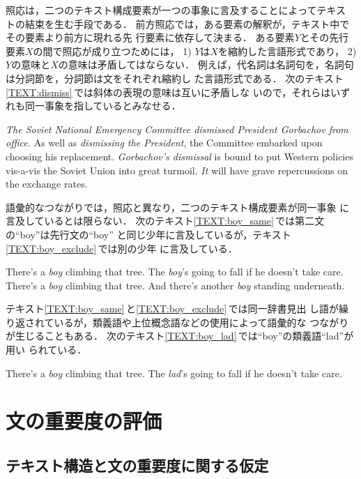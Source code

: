 照応は，二つのテキスト構成要素が一つの事象に言及することによってテキス
トの結束を生む手段である．
前方照応では，ある要素の解釈が，テキスト中でその要素より前方に現れる先
行要素に依存して決まる．
ある要素$Y$とその先行要素$X$の間で照応が成り立つためには，
1) $Y$は$X$を縮約した言語形式であり，
2) $Y$の意味と$X$の意味は矛盾してはならない\cite{Jelinek95}．
例えば，代名詞は名詞句を，名詞句は分詞節を，分詞節は文をそれぞれ縮約し
た言語形式である．
次のテキスト\ref{TEXT:dismiss}\,では斜体の表現の意味は互いに矛盾しな
いので，それらはいずれも同一事象を指しているとみなせる．
\begin{TEXT}
\text
{\it The Soviet National Emergency Committee dismissed President
Gorbachov from office.} 
As well as {\it dismissing the President}, the Committee
embarked upon choosing his replacement. 
{\it Gorbachov's dismissal} is bound to put Western policies
vis-a-vis the Soviet Union into great turmoil.
{\it It} will have grave repercussions on the exchange
rates.\label{TEXT:dismiss}
\end{TEXT}

語彙的なつながりでは，照応と異なり，二つのテキスト構成要素が同一事象
に言及しているとは限らない\cite{Halliday76}．
次のテキスト\ref{TEXT:boy_same}\,では第二文の``boy''は先行文の``boy''
と同じ少年に言及しているが，テキスト\ref{TEXT:boy_exclude}\,では別の少年
に言及している．
\begin{TEXT}
\text There's a {\it boy} climbing that tree.
The {\it boy}'s going to fall if he doesn't take care.
\label{TEXT:boy_same} 
\text There's a {\it boy} climbing that tree.
And there's another {\it boy} standing underneath.
\label{TEXT:boy_exclude}
\end{TEXT}
テキスト\ref{TEXT:boy_same}\,と\ref{TEXT:boy_exclude}\,では同一辞書見出
し語が繰り返されているが，類義語や上位概念語などの使用によって語彙的な
つながりが生じることもある．
次のテキスト\ref{TEXT:boy_lad}\,では``boy''の類義語``lad''が用い
られている．
\begin{TEXT}
\text There's a {\it boy} climbing that tree.
The {\it lad}'s going to fall if he doesn't take care.
\label{TEXT:boy_lad} 
\end{TEXT}

\vspace{-3mm}
\section{文の重要度の評価}
\label{sec:importance}

\subsection{テキスト構造と文の重要度に関する仮定}
\label{sec:importance:assumption}

